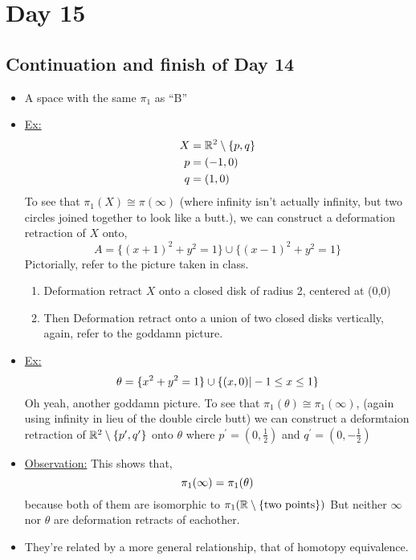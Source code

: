 \documentclass[../notes.tex]{subfiles}
\begin{document}
\section{Day 15}
\subsection{Continuation and finish of Day 14}
\begin{itemize}
    \item A space with the same $\pi_1$ as ``B''
    \item \underline{Ex:}
        \begin{align*}
            X &= \mathbb{R}^2\setminus\{p,q\}\\
            p &= (-1,0)\\
            q &= (1,0)\\
        \end{align*}
        To see that $\pi_1(X) \cong \pi(\infty)$ (where infinity isn't actually infinity,
        but two circles joined together to look like a butt.), we can construct a 
        deformation retraction of $X$ onto,
        \[
            A=\{(x+1)^2+y^2=1\}\cup \{(x-1)^2+y^2=1\}
        \]
        Pictorially, refer to the picture taken in class.
        \begin{enumerate}
            \item Deformation retract $X$ onto a closed disk of radius 2, centered
                at (0,0)
            \item Then Deformation retract onto a union of two closed disks vertically, 
                again, refer to the goddamn picture.
        \end{enumerate}
    \item
        \underline{Ex:}
        \[
            \theta=\{x^2+y^2=1\}\cup\{(x,0)| -1 \leq x \leq 1\}\\
        \]
        Oh yeah, another goddamn picture. To see that $\pi_1(\theta)\cong\pi_{1}(\infty)$,
        (again using infinity in lieu of the double circle butt)
        we can construct a deformtaion retraction of $\mathbb{R}^2\setminus\{p^{\prime},q^{\prime}\}$
        onto $\theta$ where $p^{\prime}=(0,\frac{1}{2})$ and $q^{\prime}=(0,-\frac{1}{2})$
    \item \underline{Observation:} This shows that,
        \[
            \pi_1(\infty)=\pi_1(\theta)\\
        \]
        because both of them are isomorphic to $\pi_1(\mathbb{R}\setminus\{\text{two points}\})$
        But neither $\infty$ nor $\theta$ are deformation retracts of eachother.
    \item They're related by a more general relationship, that of homotopy equivalence.
\end{itemize}
\end{document}
